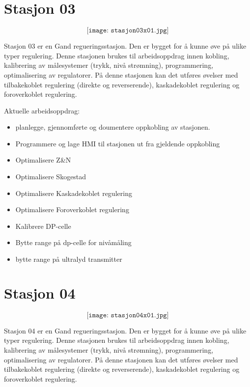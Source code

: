 \section{Stasjon 03}

$$\texttt{[image: stasjon03x01.jpg]}$$

Stasjon 03 er en Gand regueringsstasjon. Den er bygget for å kunne øve på ulike typer regulering. Denne stasjonen brukes til arbeidsoppdrag innen kobling, kalibrering av målesystemer (trykk, nivå strømning), programmering, optimalisering av regulatorer.  På denne stasjonen kan det utføres øvelser med tilbakekoblet regulering (direkte og reverserende), kaskadekoblet regulering og foroverkoblet regulering. 

Aktuelle arbeidsoppdrag:\\

\begin{itemize}[noitemsep]
	\item planlegge, gjennomførte og doumentere oppkobling av stasjonen.
	\item Programmere og lage HMI til stasjonen ut fra gjeldende oppkobling
	\item Optimalisere Z\&N
	\item Optimalisere Skogestad
	\item Optimalisere Kaskadekoblet regulering
	\item Optimalisere Foroverkoblet regulering
	\item Kalibrere DP-celle
	\item Bytte range på dp-celle for nivåmåling
	\item bytte range på ultralyd transmitter
\end{itemize}


\section{Stasjon 04}

$$\texttt{[image: stasjon04x01.jpg]}$$

Stasjon 04 er en Gand regueringsstasjon. Den er bygget for å kunne øve på ulike typer regulering. Denne stasjonen brukes til arbeidsoppdrag innen kobling, kalibrering av målesystemer (trykk, nivå strømning), programmering, optimalisering av regulatorer.  På denne stasjonen kan det utføres øvelser med tilbakekoblet regulering (direkte og reverserende), kaskadekoblet regulering og foroverkoblet regulering. 

